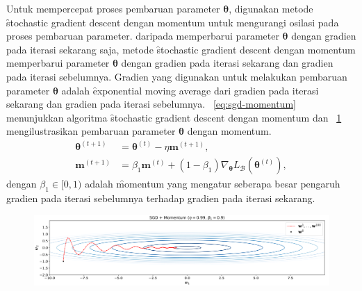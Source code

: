 Untuk mempercepat proses pembaruan parameter $\bm{\theta}$, digunakan metode \f{stochastic gradient descent} dengan momentum untuk mengurangi osilasi pada proses pembaruan parameter. daripada memperbarui parameter $\bm{\theta}$ dengan gradien pada iterasi sekarang saja, metode \f{stochastic gradient descent} dengan momentum memperbarui parameter $\bm{\theta}$ dengan gradien pada iterasi sekarang dan gradien pada iterasi sebelumnya. Gradien yang digunakan untuk melakukan pembaruan parameter $\bm{\theta}$ adalah \f{exponential moving average} dari gradien pada iterasi sekarang dan gradien pada iterasi sebelumnya. \equ~\ref{eq:sgd-momentum} menunjukkan algoritma \f{stochastic gradient descent} dengan momentum dan \pic~\ref{fig:sgd-momentum} mengilustrasikan pembaruan parameter $\bm{\theta}$ dengan momentum.
\begin{align}
    \label{eq:sgd-momentum}
    \bm{\theta}^{(t+1)} &= \bm{\theta}^{(t)} - \eta \mathbf{m}^{(t+1)}, \\
    \mathbf{m}^{(t+1)} &= \beta_1 \mathbf{m}^{(t)} + (1 - \beta_1) \nabla_{\bm{\theta}} L_{\mathcal{B}}(\bm{\theta}^{(t)}),
\end{align}
dengan $\beta_1 \in [0, 1)$ adalah \f{momentum} yang mengatur seberapa besar pengaruh gradien pada iterasi sebelumnya terhadap gradien pada iterasi sekarang.
\begin{figure}[!ht]
    \centering
    \includegraphics[width=1\textwidth]{assets/pics/sgd-momentum.png}
    \label{fig:sgd-momentum}
\end{figure}

